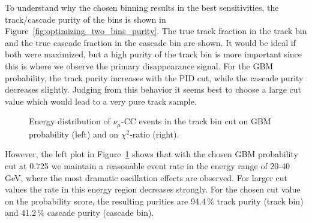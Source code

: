 To understand why the chosen binning results in the best sensitivities, the track/cascade purity of the bins is shown in Figure~\ref{fig:optimizing_two_bins_purity}.
The true track fraction in the track bin and the true cascade fraction in the cascade bin are shown.
It would be ideal if both were maximized, but a high purity of the track bin is more important since this is where we observe the primary disappearance signal.
For the GBM probability, the track purity increases with the PID cut, while the cascade purity decreases slightly.
Judging from this behavior it seems best to choose a large cut value which would lead to a very pure track sample.
\begin{figure}[h!]
    \centering
    \caption[Energy distribution of $\nu_\mu$-CC events in the track bin]{Energy distribution of $\nu_\mu$-CC events in the track bin cut on GBM probability (left) and on $\chi^2$-ratio (right).}
    \label{fig:energy_distribution_pid_bin}
\end{figure}
However, the left plot in Figure~\ref{fig:energy_distribution_pid_bin} shows that with the chosen GBM probability cut at 0.725 we maintain a reasonable event rate in the energy range of 20-40\,GeV, where the most dramatic oscillation effects are observed.
For larger cut values the rate in this energy region decreases strongly.
For the chosen cut value on the probability score, the resulting purities are 94.4\,\% track purity (track bin) and 41.2\,\% cascade purity (cascade bin).

